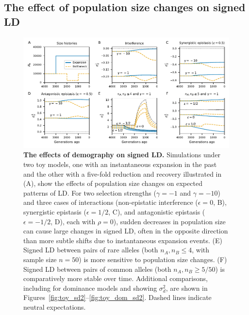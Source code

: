 \documentclass[]{article}
\begin{document}
\subsection{The effect of population size changes on signed LD}
\label{sec:demography}

\begin{figure}[tb!]
    \centering
    \includegraphics{../figures/demog_bottle_expand}
    \caption{
        \textbf{The effects of demography on signed LD.}
        Simulations under two toy models, one with an instantaneous expansion in
        the past and the other with a five-fold reduction and recovery illustrated
        in (A), show the effects of population size changes on expected patterns of LD. 
        For two selection strengths (\(\gamma=-1\) and \(\gamma=-10\)) and three
        cases of interactions (non-epistatic interference (\(\epsilon=0\), B),
        synergistic epistasis (\(\epsilon=1/2\), C), and antagonistic epistasis
        (\(\epsilon=-1/2\), D), each with \(\rho=0\)),
        sudden decreases in population size can cause
        large changes in signed LD, often in the opposite direction than more
        subtle shifts due to instantaneous expansion events.
        (E) Signed LD between pairs of rare alleles (both \(n_A, n_B \leq 4\), with
        sample size \(n=50\)) is more sensitive to population size changes.
        (F) Signed LD between pairs of common alleles (both \(n_A, n_B \geq 5/50\))
        is comparatively more stable over time.
        Additional comparisons, including for dominance models and showing
        \(\sigma_d^2\), are shown in Figures~\ref{fig:toy_sd2}--\ref{fig:toy_dom_sd2}.
        Dashed lines indicate neutral expectations.
    }
    \label{fig:toy}
\end{figure}
\end{document}

